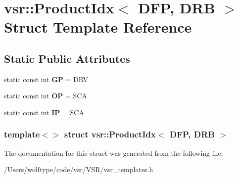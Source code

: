 \hypertarget{structvsr_1_1_product_idx_3_01_d_f_p_00_01_d_r_b_01_4}{\section{vsr\-:\-:Product\-Idx$<$ D\-F\-P, D\-R\-B $>$ Struct Template Reference}
\label{structvsr_1_1_product_idx_3_01_d_f_p_00_01_d_r_b_01_4}
}
\subsection*{Static Public Attributes}
\begin{DoxyCompactItemize}
\item 
\hypertarget{structvsr_1_1_product_idx_3_01_d_f_p_00_01_d_r_b_01_4_a9f43b774ffd24dab7e6e3a82c06c572f}{static const int {\bfseries G\-P} = D\-R\-V}\label{structvsr_1_1_product_idx_3_01_d_f_p_00_01_d_r_b_01_4_a9f43b774ffd24dab7e6e3a82c06c572f}

\item 
\hypertarget{structvsr_1_1_product_idx_3_01_d_f_p_00_01_d_r_b_01_4_a42f5d679bede7c1a1b997cd3a009303f}{static const int {\bfseries O\-P} = S\-C\-A}\label{structvsr_1_1_product_idx_3_01_d_f_p_00_01_d_r_b_01_4_a42f5d679bede7c1a1b997cd3a009303f}

\item 
\hypertarget{structvsr_1_1_product_idx_3_01_d_f_p_00_01_d_r_b_01_4_a77de0fb70fa8a9a33e3a68cf9f5b571f}{static const int {\bfseries I\-P} = S\-C\-A}\label{structvsr_1_1_product_idx_3_01_d_f_p_00_01_d_r_b_01_4_a77de0fb70fa8a9a33e3a68cf9f5b571f}

\end{DoxyCompactItemize}
\subsubsection*{template$<$$>$ struct vsr\-::\-Product\-Idx$<$ D\-F\-P, D\-R\-B $>$}



The documentation for this struct was generated from the following file\-:\begin{DoxyCompactItemize}
\item 
/\-Users/wolftype/code/vsr/\-V\-S\-R/vsr\-\_\-templates.\-h\end{DoxyCompactItemize}
